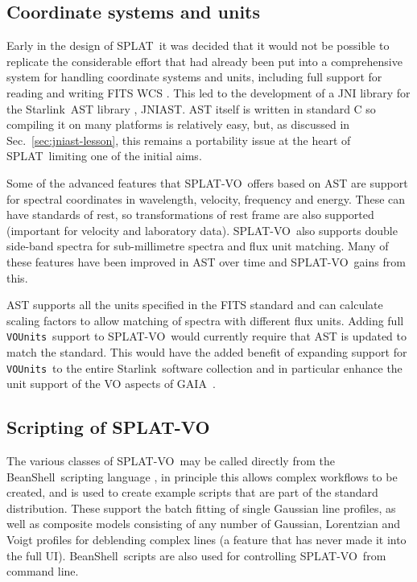 \documentclass[final,authoryear,5p,times,twocolumn]{elsarticle}
\newcommand{\vounits}{\texttt{VOUnits}}
\newcommand{\splat}{\textsf{\small SPLAT}}
\newcommand{\splatvo}{{\textsf{\small{SPLAT-VO}}}}
\newcommand{\gaia}{\textsf{\small GAIA}}
\newcommand{\Starlink}{\textsf{\small Starlink}}
\newcommand{\beanshell}{\textsf{\small BeanShell}}
\newcommand{\ascl}[1]{\href{http://www.ascl.net/#1}{ascl:#1}}
\begin{document}
\subsection{Coordinate systems and units}

Early in the design of \splat\ it was decided that it would not be possible to
replicate the considerable effort that had already been put into a
comprehensive system for handling coordinate systems and units, including full
support for reading and writing FITS WCS \citep{2006A&A...446..747G}. This led to the development of a JNI
library for the \Starlink\ AST library \citep[][\ascl{1404.016}]{1998ASPC..145...41W,2012ASPC..461..825B}, JNIAST. AST
itself is written in standard C so compiling it on many platforms is
relatively easy, but, as discussed in Sec.\ \ref{sec:jniast-lesson}, this remains a portability issue at the heart of \splat\
limiting one of the initial aims.

Some of the advanced features that \splatvo\ offers based on AST are support
for spectral coordinates in wavelength, velocity, frequency and energy. These
can have standards of rest, so transformations of rest frame are also
supported (important for velocity and laboratory data). \splatvo\ also supports
double side-band spectra for sub-millimetre spectra and flux unit matching. Many of these features
have been improved in AST over time and \splatvo\ gains from this.

AST supports all the units specified in the FITS standard
\citep{2010A&A...524A..42P} and can calculate scaling factors to allow
matching of spectra with different flux units. Adding full \vounits\
support \citep{vounits} to \splatvo\ would currently require that AST
is updated to match the standard. This would have the added benefit of
expanding support for \vounits\ to the entire \Starlink\ software
collection and in particular enhance the unit support of the VO
aspects of \gaia\ \citep{2009ASPC..411..575D}.


\subsection{Scripting of SPLAT-VO}

The various classes of \splatvo\ may be called directly from the \beanshell\
scripting language \citep{niemeyer2013learning}, in principle this allows
complex workflows to be created, and is used to create example scripts that
are part of the standard distribution. These support the batch fitting of
single Gaussian line profiles, as well as composite models consisting of any
number of Gaussian, Lorentzian and Voigt profiles for deblending complex lines
(a feature that has never made it into the full UI). \beanshell\  scripts are
also used for controlling \splatvo\ from command line.
\end{document}
